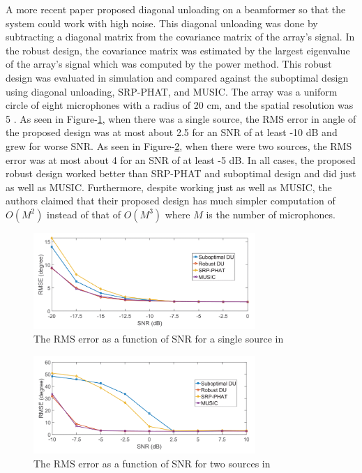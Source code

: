 \documentclass{report}
\begin{document}
A more recent paper \cite{salvati_power_2019} proposed diagonal unloading on a beamformer so that the system could work with high noise. This diagonal unloading was done by subtracting a diagonal matrix from the covariance matrix of the array's signal. In the robust design, the covariance matrix was estimated by the largest eigenvalue of the array's signal which was computed by the power method. This robust design was evaluated in simulation and compared against the suboptimal design using diagonal unloading, SRP-PHAT, and MUSIC. The array was a uniform circle of eight microphones with a radius of 20 \si{cm}, and the spatial resolution was 5 \si{\deg}. As seen in Figure-\ref{fig:salvati_2019_RMSE_SNR}, when there was a single source, the RMS error in angle of the proposed design was at most about 2.5 \si{\deg} for an SNR of at least -10 \si{dB} and grew for worse SNR. As seen in Figure-\ref{fig:salvati_2019_RMSE_SNR_two}, when there were two sources, the RMS error was at most about 4 \si{\deg} for an SNR of at least -5 \si{dB}. In all cases, the proposed robust design worked better than SRP-PHAT and suboptimal design and did just as well as MUSIC. Furthermore, despite working just as well as MUSIC, the authors claimed that their proposed design has much simpler computation of $O(M^2)$ instead of that of $O(M^3)$ where $M$ is the number of microphones.

\begin{figure}[H]
\includegraphics[width=0.75\textwidth]{./salvati_2019/RMSE_SNR.png}
\centering
\caption{The RMS error as a function of SNR for a single source in \cite{salvati_power_2019}}
\label{fig:salvati_2019_RMSE_SNR}
\centering
\end{figure}

\begin{figure}[H]
\includegraphics[width=0.75\textwidth]{./salvati_2019/RMSE_SNR_two.png}
\centering
\caption{The RMS error as a function of SNR for two sources in \cite{salvati_power_2019}}
\label{fig:salvati_2019_RMSE_SNR_two}
\centering
\end{figure}
\end{document}
